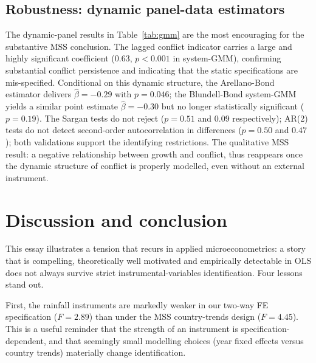 \documentclass[11pt,a4paper]{article}
\begin{document}
\subsection{Robustness: dynamic panel-data estimators}
The dynamic-panel results in Table~\ref{tab:gmm} are the most
encouraging for the substantive MSS conclusion. The lagged conflict
indicator carries a large and highly significant coefficient
($0.63$, $p<0.001$ in system-GMM), confirming substantial conflict
persistence and indicating that the static specifications are
mis-specified. Conditional on this dynamic structure, the
Arellano-Bond estimator delivers $\hat\beta=-0.29$ with $p=0.046$;
the Blundell-Bond system-GMM yields a similar point estimate
$\hat\beta=-0.30$ but no longer statistically significant
($p=0.19$). The Sargan tests do not reject ($p=0.51$ and $0.09$
respectively); AR(2) tests do not detect second-order
autocorrelation in differences ($p=0.50$ and $0.47$); both
validations support the identifying restrictions. The qualitative
MSS result: a negative relationship between growth and
conflict, thus reappears once the dynamic structure of conflict is
properly modelled, even without an external instrument.

\begin{table}[H]
\centering
\small

\caption{Dynamic panel-data estimators of conflict on growth. Two-step robust standard errors. Collapsed instrument matrix with lag depth 2--3.}
\label{tab:gmm}
\end{table}

\section{Discussion and conclusion}\label{sec:conc}
This essay illustrates a tension that recurs in applied
microeconometrics: a story that is compelling, theoretically well
motivated and empirically detectable in OLS does not always survive
strict instrumental-variables identification. Four lessons stand
out.

First, the rainfall instruments are markedly weaker in our two-way
FE specification ($F=2.89$) than under the MSS country-trends design
($F=4.45$). This is a useful reminder that the strength of an
instrument is specification-dependent, and that seemingly small
modelling choices (year fixed effects versus country trends)
materially change identification.
\end{document}
